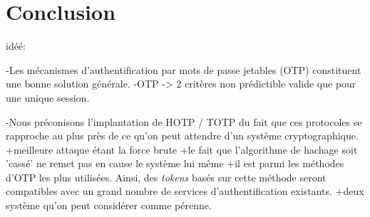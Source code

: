 \documentclass{../res/univ-projet}
\begin{document}
\setcounter{section}{0}
\part{Conclusion}
idéé:

-Les mécanismes d'authentification par mots de passe jetables (OTP) constituent une bonne solution générale.
-OTP -> 2 critères non prédictible valide que pour une unique session.

-Nous préconisons l'implantation de HOTP / TOTP du fait que ces protocoles se rapproche au plus près de ce qu'on peut
attendre d'un système cryptographique. 
  +meilleure attaque étant la force brute
  +le fait que l'algorithme de hachage soit 'cassé' ne remet pas en cause le système lui même
  +il est parmi les m\'ethodes d'OTP les plus utilis\'ees. Ainsi, des \emph{tokens} bas\'es sur cette m\'ethode 
  seront compatibles avec un grand nombre de services d'authentification existants.
  +deux système qu'on peut considérer comme pérenne.
  
  
\end{document}
